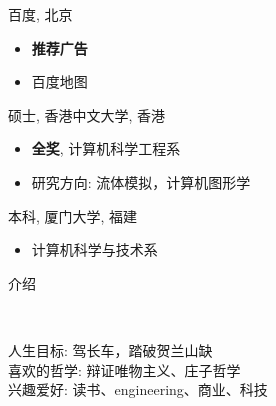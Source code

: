 \documentclass[20pt,a4paper]{article}
\newenvironment{changemargin}[2]{%
  \begin{list}{}{%
    \setlength{\topsep}{0pt}%
    \setlength{\leftmargin}{#1}%
    \setlength{\rightmargin}{#2}%
    \setlength{\listparindent}{\parindent}%
    \setlength{\itemindent}{\parindent}%
    \setlength{\parsep}{\parskip}%
  }%
  \item[]}{\end{list}
}
\newcommand{\lineover}{
	\begin{changemargin}{-0.05in}{-0.05in}
		\vspace*{-8pt}
		\hrulefill \\
		\vspace*{-2pt}
	\end{changemargin}
}
\newcommand{\header}[1]{
	\begin{changemargin}{-0.5in}{-0.5in}
		\scshape{#1}\\
  	\lineover
	\end{changemargin}
}
\newenvironment{body} {
	\vspace*{-16pt}
	\begin{changemargin}{-0.25in}{-0.5in}
  }	
	{\end{changemargin}
}
\begin{document}
\begin{body}
	\vspace{14pt}
	百度, 北京\\
	\begin{itemize}
		\item \textbf{推荐广告}  \hfill \emph{} \\
		\item 百度地图  \hfill \emph{} \\	
	\end{itemize}
	硕士, 香港中文大学, 香港\\
	\begin{itemize}    
    		\item \textbf{全奖}, 计算机科学工程系 \hfill \emph{} \\
		\item 研究方向: 流体模拟，计算机图形学\\
	\end{itemize}
	本科, 厦门大学, 福建\\
	\begin{itemize}
		\item 计算机科学与技术系  \hfill \emph{} \\
	\end{itemize}
\end{body}

\header{介绍}

\begin{body}
	\vspace{14pt}
	人生目标: 驾长车，踏破贺兰山缺\\
	喜欢的哲学: 辩证唯物主义、庄子哲学\\
	兴趣爱好: 读书、engineering、商业、科技
	
\end{body}

\end{document}
